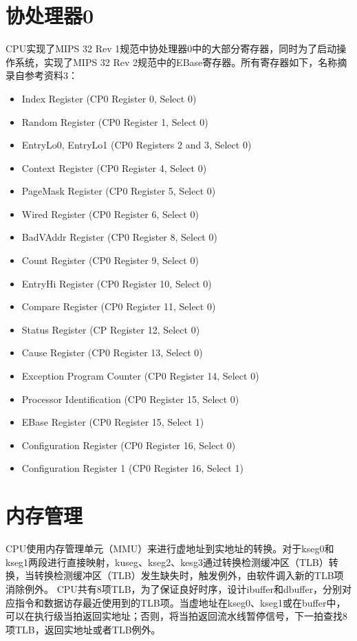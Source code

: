 \section{协处理器0}
CPU实现了MIPS 32 Rev 1规范中协处理器0中的大部分寄存器，同时为了启动操作系统，实现了MIPS 32 Rev 2规范中的EBase寄存器。所有寄存器如下，名称摘录自参考资料3：
\begin{itemize}
    \item Index Register (CP0 Register 0, Select 0)
    \item Random Register (CP0 Register 1, Select 0)
    \item EntryLo0, EntryLo1 (CP0 Registers 2 and 3, Select 0)
    \item Context Register (CP0 Register 4, Select 0)
    \item PageMask Register (CP0 Register 5, Select 0)
    \item Wired Register (CP0 Register 6, Select 0)
    \item BadVAddr Register (CP0 Register 8, Select 0) 
    \item Count Register (CP0 Register 9, Select 0)
    \item EntryHi Register (CP0 Register 10, Select 0)
    \item  Compare Register (CP0 Register 11, Select 0)
    \item  Status Register (CP Register 12, Select 0)
    \item  Cause Register (CP0 Register 13, Select 0)
    \item  Exception Program Counter (CP0 Register 14, Select 0)
    \item  Processor Identiﬁcation (CP0 Register 15, Select 0)
    \item  EBase Register (CP0 Register 15, Select 1)
    \item  Conﬁguration Register (CP0 Register 16, Select 0)
    \item  Conﬁguration Register 1 (CP0 Register 16, Select 1)    
\end{itemize}

\section{内存管理}

CPU使用内存管理单元（MMU）来进行虚地址到实地址的转换。对于kseg0和kseg1两段进行直接映射，kuseg、kseg2、kesg3通过转换检测缓冲区（TLB）转换，当转换检测缓冲区（TLB）发生缺失时，触发例外，由软件调入新的TLB项消除例外。
CPU共有8项TLB，为了保证良好时序，设计ibuffer和dbuffer，分别对应指令和数据访存最近使用到的TLB项。当虚地址在kseg0、kseg1或在buffer中，可以在执行级当拍返回实地址；否则，将当拍返回流水线暂停信号，下一拍查找8项TLB，返回实地址或者TLB例外。

